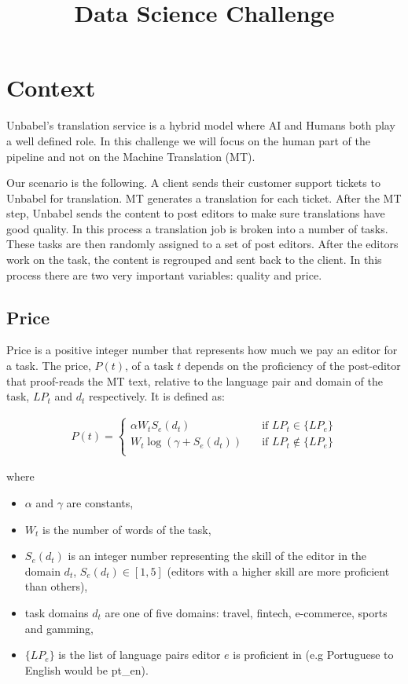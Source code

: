 \documentclass[]{extarticle}
\title{Data Science Challenge}
\begin{document}
\maketitle

\section{Context}\label{sec:context}

Unbabel's translation service is a hybrid model where AI and Humans both play a well defined role.
In this challenge we will focus on the human part of the pipeline and not on the Machine Translation (MT).

Our scenario is the following.
A client sends their customer support tickets to Unbabel for translation.
MT generates a translation for each ticket.
After the MT step, Unbabel sends the content to post editors to make sure translations have good quality.
In this process a translation job is broken into a number of tasks.
These tasks are then randomly assigned to a set of post editors.
After the editors work on the task, the content is regrouped and sent back to the client.
In this process there are two very important variables: quality and price.

\subsection*{Price}
Price is a positive integer number that represents how much we pay an editor for a task.
The price, $P(t)$, of a task $t$ depends on the proficiency of the post-editor that proof-reads the MT text, relative to the language pair and domain of the task, $LP_t$ and $d_t$ respectively.
It is defined as:

\begin{align}
P(t) =
  \begin{cases}
    \alpha W_t  S_e(d_t)      & \quad \text{if } LP_t \in \{LP_e\}  \\
    W_t \log(\gamma + S_e(d_t))        & \quad \text{if } LP_t \notin \{LP_e\}  \\
  \end{cases}
\end{align}

where

\begin{itemize}
\item $\alpha$ and $\gamma$ are constants,
\item $W_t$ is the number of words of the task,
\item $S_e(d_t)$ is an integer number representing the skill of the editor in the domain $d_t$,  $S_e(d_t) \in [1,5]$ (editors with a higher skill are more proficient than others),
\item task domains $d_t$ are one of five domains: travel, fintech, e-commerce, sports and gamming,
\item $\{LP_e\}$ is the list of language pairs editor $e$ is proficient in (e.g Portuguese to English would be pt\_en).
\end{itemize}
\end{document}
